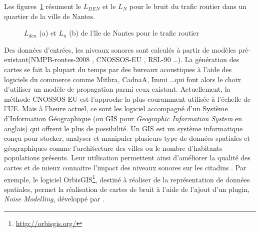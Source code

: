 Les figures~\ref{fig:carto_nantes} résument le $L_{DEN}$ et le $L_N$ pour le bruit du trafic routier dans un quartier de la ville de Nantes.\\

\begin{figure}[!h]
\centering
{}
\caption{$L_{den}$ (a) et $L_n$ (b) de l'île de Nantes pour le trafic routier \cite{nantes_carte}}
\label{fig:carto_nantes}
\end{figure}

Des données d'entrées, les niveaux sonores sont calculés à partir de modèles pré-existant(NMPB-routes-2008\cite{setra_prevision_2009-1} \cite{setra_prevision_2009-2}, CNOSSOS-EU \cite{CNOSSOS}, RSL-90 \dots). La génération des cartes se fait la plupart du temps par des bureaux acoustiques à l'aide des logiciels du commerce comme Mithra, CadnaA, Immi \dots qui font alors le choix d'utiliser un modèle de propagation parmi ceux existant. Actuellement, la méthode CNOSSOS-EU est l'approche la plus couramment utilisée à l'échelle de l'UE. Mais à l'heure actuel, ce sont les logiciel accompagné d'un Système d'Information Géographique (ou GIS pour \textit{Geographic Information System} en anglais) qui offrent le plus de possibilité. Un GIS est un système informatique conçu pour stocker, analyser et manipuler plusieurs type de données spatiales et géographiques comme l'architecture des villes ou le nombre d'habitants populations présents. Leur utilisation permettent ainsi d'améliorer la qualité des cartes et de mieux connaitre l'impact des niveaux sonores sur les citadins \cite{murphy_scenario_2011}. Par exemple, le logiciel OrbisGIS\footnote{\url{http://orbisgis.org/}}, destiné à réaliser de la représentation de données spatiales, permet la réalisation de cartes de bruit à l'aide de l'ajout d'un plugin, \textit{Noise Modelling}, développé par \cite{fortin:hal-00845701}.\\

